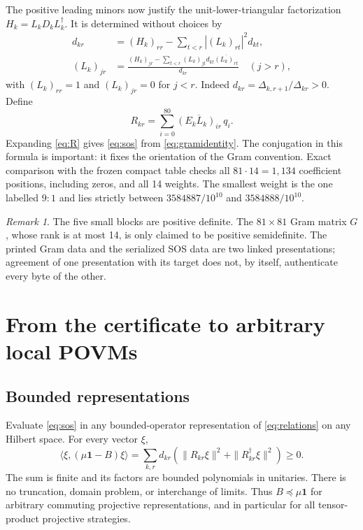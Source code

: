 \documentclass[11pt,a4paper]{article}
\numberwithin{equation}{section}
\theoremstyle{remark}\newtheorem{remark}[theorem]{Remark}
\newcommand{\id}{\mathbf 1}
\newcommand{\adj}{\dagger}
\begin{document}
The positive leading minors now justify the unit-lower-triangular
factorization $H_k=L_kD_kL_k^\adj$. It is determined without choices by
\begin{align}
 d_{kr}&=(H_k)_{rr}-\sum_{t<r}|(L_k)_{rt}|^2d_{kt},\label{eq:ldl1}\\
 (L_k)_{jr}&=\frac{(H_k)_{jr}-\sum_{t<r}(L_k)_{jt}d_{kt}
                       \overline{(L_k)_{rt}}}{d_{kr}}\quad(j>r),\label{eq:ldl2}
\end{align}
with $(L_k)_{rr}=1$ and $(L_k)_{jr}=0$ for $j<r$.
Indeed $d_{kr}=\Delta_{k,r+1}/\Delta_{kr}>0$.
Define
\begin{equation}\label{eq:R}
 R_{kr}=\sum_{i=0}^{80}\overline{(E_kL_k)_{ir}}\,q_i.
\end{equation}
Expanding \eqref{eq:R} gives \eqref{eq:sos} from \eqref{eq:gramidentity}.
The conjugation in this formula is important: it fixes the orientation
of the Gram convention. Exact comparison with the frozen compact table
checks all $81\cdot14=1{,}134$ coefficient positions, including zeros, and
all 14 weights. The smallest weight is the one labelled $9{:}1$ and lies
strictly between $3584887/10^{10}$ and $3584888/10^{10}$.

\begin{remark}
The five small blocks are positive definite. The $81\times81$ Gram matrix
$G$, whose rank is at most 14, is only claimed to be positive semidefinite.
The printed Gram data and the serialized SOS data are two linked
presentations; agreement of one presentation with its target does not, by
itself, authenticate every byte of the other.
\end{remark}

\section{From the certificate to arbitrary local POVMs}\label{sec:bridge}
\subsection{Bounded representations}
Evaluate \eqref{eq:sos} in any bounded-operator representation of
\eqref{eq:relations} on any Hilbert space. For every vector $\xi$,
\begin{equation}\label{eq:positiverepresentation}
 \langle\xi,(\mu\id-B)\xi\rangle
 =\sum_{k,r}d_{kr}\left(\|R_{kr}\xi\|^2+
                                    \|R_{kr}^\adj\xi\|^2\right)\geq0.
\end{equation}
The sum is finite and its factors are bounded polynomials in unitaries.
There is no truncation, domain problem, or interchange of limits.
Thus $B\preceq\mu\id$ for arbitrary commuting projective representations,
and in particular for all tensor-product projective strategies.
\end{document}

